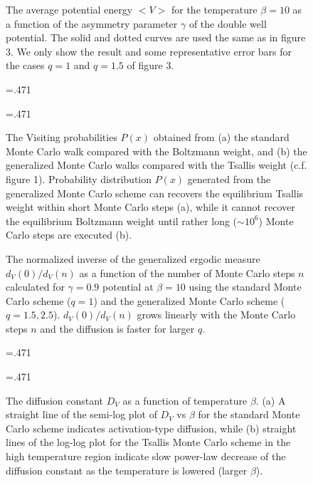 \begin{figure}[th]
\epsfxsize=8cm \centerline{}
\caption{The average potential energy $<V>$ for the temperature 
$\beta=10$ as a function of the asymmetry parameter $\gamma$ of 
the double well potential. The solid and dotted curves are
used the same as in figure 3.  We only show the result and some 
representative error bars for the cases $q=1$ and $q=1.5$
of figure 3.} 
\label{fig:5}
\end{figure}

\begin{figure}[th]
   \def\halftext{.471\textwidth}
   \parbox{\halftext}{
      \epsfxsize=\halftext 
   }
   \hspace{4mm}
   \parbox{\halftext}{
      \epsfxsize=\halftext 
   }
\caption{The Visiting probabilities $P(x)$ obtained from
(a) the standard Monte Carlo walk compared with the
Boltzmann weight, and (b) the generalized Monte Carlo 
walks compared with the Tsallis weight (c.f. figure 1).
Probability distribution $P(x)$ generated from the
generalized Monte Carlo scheme can recovers the 
equilibrium Tsallis weight within short Monte Carlo 
steps (a), while it cannot recover the equilibrium 
Boltzmann weight until rather long ($\sim 10^{6}$) Monte 
Carlo steps are executed (b).} 
\vspace*{20mm}
\label{fig:6}
\end{figure}

\begin{figure}[th]
\epsfxsize=8cm \centerline{}
\caption{The normalized inverse of the generalized ergodic 
measure $d_{V}(0)/d_{V}(n)$ as a function of the number of
Monte Carlo steps $n$ calculated for $\gamma=0.9$ 
potential at $\beta=10$ using the standard Monte
Carlo scheme ($q=1$) and the generalized Monte Carlo
scheme ($q=1.5, 2.5$).  $d_{V}(0)/d_{V}(n)$ grows linearly
with the Monte Carlo steps $n$ and the diffusion is faster 
for larger $q$.} 
\label{fig:7}
\end{figure}

\begin{figure}[th]
   \def\halftext{.471\textwidth}
   \parbox{\halftext}{
      \epsfxsize=\halftext 
   }
   \hspace{4mm}
   \parbox{\halftext}{
      \epsfxsize=\halftext 
   }
\caption{The diffusion constant $D_{V}$ as a function of 
temperature $\beta$.  (a) A straight line of the semi-log plot 
of $D_{V}$ vs $\beta$ for the standard Monte Carlo scheme 
indicates activation-type diffusion, while (b) straight 
lines of the log-log plot for the Tsallis Monte Carlo scheme 
in the high temperature region indicate slow power-law 
decrease of the diffusion constant as the temperature is lowered (larger
$\beta$).} 
\vspace*{20mm}
\label{fig:8}
\end{figure}


